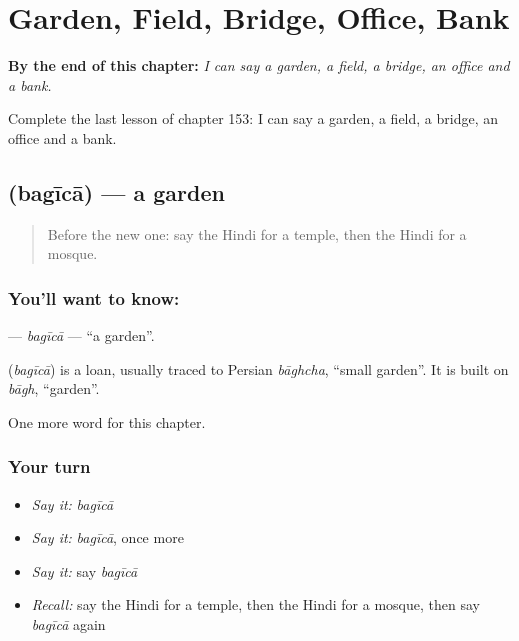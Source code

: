 
\chapter{Garden, Field, Bridge, Office, Bank}
\label{ch:hi-garden-field-bridge-office-bank}

\begin{chapteropening}
\textbf{By the end of this chapter:} \emph{I can say a garden, a field, a bridge, an office and a bank.}

Complete the last lesson of chapter 153: I can say a garden, a field, a bridge, an office and a bank.
\end{chapteropening}

\section[\texorpdfstring{\hi{बगीचा} (bagīcā)}{बगीचा (bagīcā)}]{ (bagīcā) — a garden}

\label{lesson:HI-C153-bagica}



\begin{quote}
Before the new one: say the Hindi for a temple, then the Hindi for a mosque.
\end{quote}

\subsection*{You'll want to know: }
\textbf{} — \emph{bagīcā} — \textquotedblleft{}a garden\textquotedblright{}.

\begin{cousinweb}
\textbf{} (\emph{bagīcā}) is a loan, usually traced to Persian \emph{bāghcha}, \textquotedblleft{}small garden\textquotedblright{}. It is built on \emph{bāgh}, \textquotedblleft{}garden\textquotedblright{}.
\end{cousinweb}

\begin{grammarlens}[title={What you've built}]
One more word for this chapter.
\end{grammarlens}

\subsection*{Your turn}
\begin{itemize}
\raggedright
  \item \emph{Say it:} \emph{bagīcā}
  \item \emph{Say it:} \emph{bagīcā}, once more
  \item \emph{Say it:} say \emph{bagīcā}
  \item \emph{Recall:} say the Hindi for a temple, then the Hindi for a mosque, then say \emph{bagīcā} again
\end{itemize}

